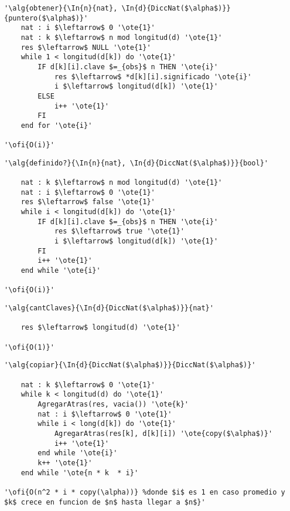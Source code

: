 \begin{lstlisting}[mathescape]
'\alg{obtener}{\In{n}{nat}, \In{d}{DiccNat($\alpha$)}}{puntero($\alpha$)}'
	nat : i $\leftarrow$ 0 '\ote{1}'
	nat : k $\leftarrow$ n mod longitud(d) '\ote{1}'
	res $\leftarrow$ NULL '\ote{1}'
	while 1 < longitud(d[k]) do '\ote{1}'
		IF d[k][i].clave $=_{obs}$ n THEN '\ote{i}'
			res $\leftarrow$ *d[k][i].significado '\ote{i}'
			i $\leftarrow$ longitud(d[k]) '\ote{1}'
		ELSE
			i++ '\ote{1}'
		FI
	end for '\ote{i}'

'\ofi{O(i)}'
\end{lstlisting}

\begin{lstlisting}[mathescape]
'\alg{definido?}{\In{n}{nat}, \In{d}{DiccNat($\alpha$)}}{bool}'

	nat : k $\leftarrow$ n mod longitud(d) '\ote{1}'
	nat : i $\leftarrow$ 0 '\ote{1}'
	res $\leftarrow$ false '\ote{1}'
	while i < longitud(d[k]) do '\ote{1}'
		IF d[k][i].clave $=_{obs}$ n THEN '\ote{i}'
			res $\leftarrow$ true '\ote{1}'
			i $\leftarrow$ longitud(d[k]) '\ote{1}'
		FI
		i++ '\ote{1}'
	end while '\ote{i}'

'\ofi{O(i)}'
\end{lstlisting}

\begin{lstlisting}[mathescape]
'\alg{cantClaves}{\In{d}{DiccNat($\alpha$)}}{nat}'

	res $\leftarrow$ longitud(d) '\ote{1}'

'\ofi{O(1)}'
\end{lstlisting}

\begin{lstlisting}[mathescape]
'\alg{copiar}{\In{d}{DiccNat($\alpha$)}}{DiccNat($\alpha$)}'

	nat : k $\leftarrow$ 0 '\ote{1}'
	while k < longitud(d) do '\ote{1}'
		AgregarAtras(res, vacia()) '\ote{k}'
		nat : i $\leftarrow$ 0 '\ote{1}'
		while i < long(d[k]) do '\ote{1}'
			AgregarAtras(res[k], d[k][i]) '\ote{copy($\alpha$)}'
			i++ '\ote{1}'
		end while '\ote{i}'
		k++ '\ote{1}'
	end while '\ote{n * k  * i}'

'\ofi{O(n^2 * i * copy(\alpha))} %donde $i$ es 1 en caso promedio y $k$ crece en funcion de $n$ hasta llegar a $n$}'
\end{lstlisting}
